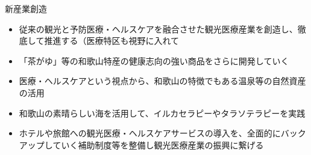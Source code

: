 \documentclass[dvipdfmx]{beamer}
\begin{document}
    \begin{frame}{新産業創造}{}
        \begin{small}
            \begin{itemize}
                \setlength{\parsep}{.5mm}
                \setlength{\itemsep}{2mm}
                \item 従来の観光と予防医療・ヘルスケアを融合させた観光医療産業を創造し、徹底して推進する（医療特区も視野に入れて
                \item 「茶がゆ」等の和歌山特産の健康志向の強い商品をさらに開発していく
                \item 医療・ヘルスケアという視点から、和歌山の特徴でもある温泉等の自然資産の活用
                \item 和歌山の素晴らしい海を活用して、イルカセラピーやタラソテラピーを実践
                \item ホテルや旅館への観光医療・ヘルスケアサービスの導入を、全面的にバックアップしていく補助制度等を整備し観光医療産業の振興に繋げる
            \end{itemize}
        \end{small}
    \end{frame}
    
\end{document}
